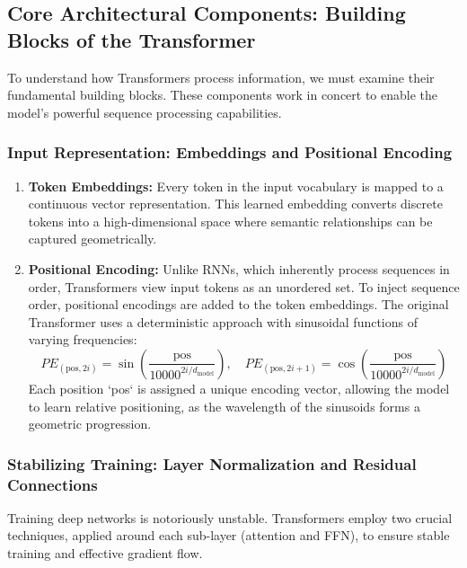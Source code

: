 \subsection{Core Architectural Components: Building Blocks of the Transformer}

To understand how Transformers process information, we must examine their fundamental building blocks. These components work in concert to enable the model's powerful sequence processing capabilities.

\subsubsection{Input Representation: Embeddings and Positional Encoding}

\begin{enumerate}
    \item \textbf{Token Embeddings:} Every token in the input vocabulary is mapped to a continuous vector representation. This learned embedding converts discrete tokens into a high-dimensional space where semantic relationships can be captured geometrically.

    \item \textbf{Positional Encoding:} Unlike RNNs, which inherently process sequences in order, Transformers view input tokens as an unordered set. To inject sequence order, positional encodings are added to the token embeddings. The original Transformer uses a deterministic approach with sinusoidal functions of varying frequencies:
\begin{equation}
    PE_{(\text{pos}, 2i)} = \sin\left(\frac{\text{pos}}{10000^{2i/d_{\text{model}}}}\right), \quad
    PE_{(\text{pos}, 2i+1)} = \cos\left(\frac{\text{pos}}{10000^{2i/d_{\text{model}}}}\right)
\end{equation}
Each position `pos` is assigned a unique encoding vector, allowing the model to learn relative positioning, as the wavelength of the sinusoids forms a geometric progression.
\end{enumerate}


\subsubsection{Stabilizing Training: Layer Normalization and Residual Connections}

Training deep networks is notoriously unstable. Transformers employ two crucial techniques, applied around each sub-layer (attention and FFN), to ensure stable training and effective gradient flow.

